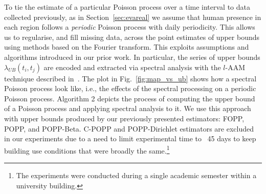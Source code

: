 To tie the estimate of a particular Poisson process over a time interval to data collected previously, as in Section~\ref{sec:evareal} we assume that human presence in each region follows a \emph{periodic} Poisson process with daily periodicity. This allows us to regularise, and fill missing data, across the point estimates of upper bounds using methods based on the Fourier transform.  This exploits assumptions and algorithms introduced in our prior work. In particular, the series of upper bounds $\lambda_{UB}(t_i, t_j)$ are encoded and extracted via spectral analysis with the $l$-AAM technique described in~\cite{jovan_iros16}. The plot in Fig.~\ref{fig:map_vs_ub} shows how a spectral Poisson process look like, i.e., the effects of the spectral processing on a periodic Poisson process. Algorithm 2 depicts the process of computing the upper bound of a Poisson process and applying spectral analysis to it. We use this approach with upper bounds produced by our previously presented estimators: FOPP, POPP, and POPP-Beta. C-POPP and POPP-Dirichlet estimators are excluded in our experiments due to a need to limit experimental time to ~45 days to keep building use conditions that were broadly the same.\footnote{The experiments were conducted during a single academic semester within a university building.}

